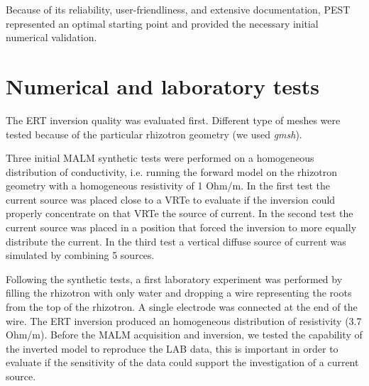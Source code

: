 \documentclass{article}
\begin{document}
Because of its reliability, user-friendliness, and extensive documentation, PEST represented an optimal starting point and provided the necessary initial numerical validation.

\section{Numerical and laboratory tests}
The ERT inversion quality was evaluated first. Different type of meshes were tested because of the particular rhizotron geometry (we used \textit{gmsh}).

Three initial MALM synthetic tests were performed on a homogeneous distribution of conductivity, i.e. running the forward model on the rhizotron geometry with a homogeneous resistivity of 1 Ohm/m.
In the first test the current source was placed close to a VRTe to evaluate if the inversion could properly concentrate on that VRTe the source of current. In the second test the current source was placed in a position that forced the inversion to more equally distribute the current. In the third test a vertical diffuse source of current was simulated by combining 5 sources.

Following the synthetic tests, a first laboratory experiment was performed by filling the rhizotron with only water and dropping a wire representing the roots from the top of the rhizotron. A single electrode was connected at the end of the wire. The ERT inversion produced an homogeneous distribution of resistivity (3.7 Ohm/m). Before the MALM acquisition and inversion, we tested the capability of the inverted model to reproduce the LAB data, this is important in order to evaluate if the sensitivity of the data could support the investigation of a current source.
\end{document}
